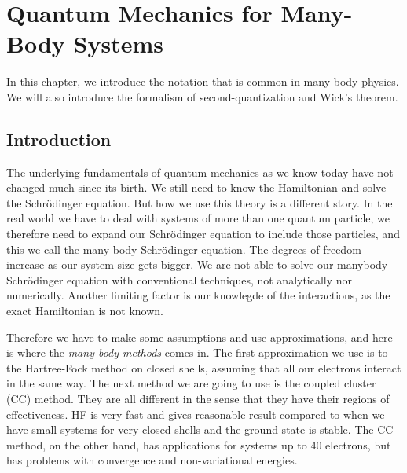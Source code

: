 \chapter{Quantum Mechanics for Many-Body Systems}
In this chapter, we introduce the notation that is common in many-body physics. We will also introduce the formalism of second-quantization and Wick's theorem.

\section{Introduction}
The underlying fundamentals of quantum mechanics as we know today have not changed much since its birth. We still need to know the Hamiltonian and solve the Schr\"{o}dinger equation. But how we use this theory is a different story. In the real world we have to deal with systems of more than one quantum particle, we therefore need to expand our Schr\"{o}dinger equation to include those particles, and this we call the many-body Schr\"{o}dinger equation. The degrees of freedom increase as our system size gets bigger. We are not able to solve our manybody Schr\"{o}dinger equation with conventional techniques, not analytically nor numerically. Another limiting factor is our knowlegde of the interactions, as the exact Hamiltonian is not known.

Therefore we have to make some assumptions and use approximations, and here is where the \emph{many-body methods} comes in. The first approximation we use is to the Hartree-Fock method on closed shells, assuming that all our electrons interact in the same way. The next method we are going to use is the coupled cluster (CC) method. They are all different in the sense that they have their regions of effectiveness. HF is very fast and gives reasonable result compared to  when we have small systems for very closed shells and the ground state is stable. The CC method, on the other hand, has applications for systems up to 40 electrons, but has problems with convergence and non-variational energies.


